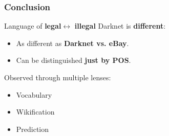 \documentclass[t,xcolor={svgnames,table},aspectratio=169]{beamer}
\begin{document}
\begin{frame}
	\frametitle{Conclusion}
	\Large
	\begin{minipage}{.65\textwidth}
	Language of \textbf{\color{green} legal}$\leftrightarrow$\textbf{\color{red} illegal} Darknet is \textbf{different}:
	\begin{itemize}\setlength\itemsep{1em}
	\item As different as \textbf{Darknet vs. \color{yellow}eBay}.
	\item Can be distinguished \textbf{just by POS}.
	\end{itemize}
	\end{minipage}
	\begin{minipage}{.3\textwidth}
	\end{minipage}
	\vfill
	\pause
	
	Observed through multiple lenses:
	
	\begin{minipage}{.25\textwidth}
	\begin{itemize}
	\item Vocabulary
	\end{itemize}
	\end{minipage}
	\begin{minipage}{.25\textwidth}
	\begin{itemize}
	\item Wikification
	\end{itemize}
	\end{minipage}
	\begin{minipage}{.2\textwidth}
	\begin{itemize}
	\item Prediction
	\end{itemize}
	\end{minipage}
	\pause
	\vfill
	

\end{frame}
\end{document}
